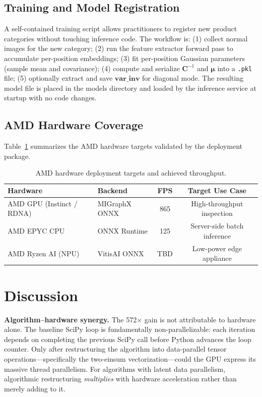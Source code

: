 \documentclass[blind]{gtac}
\begin{document}
\subsection{Training and Model Registration}

A self-contained training script allows practitioners to register new product
categories without touching inference code.  The workflow is:
(1) collect normal images for the new category;
(2) run the feature extractor forward pass to accumulate per-position embeddings;
(3) fit per-position Gaussian parameters (sample mean and covariance);
(4) compute and serialize $\mathbf{C}^{-1}$ and $\boldsymbol{\mu}$ into a
    \texttt{.pkl} file;
(5) optionally extract and save $\mathbf{var\_inv}$ for diagonal mode.
The resulting model file is placed in the models directory and loaded by the
inference service at startup with no code changes.

\subsection{AMD Hardware Coverage}

Table~\ref{tab:hw} summarizes the AMD hardware targets validated by the
deployment package.

\begin{table}[H]
\centering
\caption{AMD hardware deployment targets and achieved throughput.}
\label{tab:hw}
\footnotesize
\begin{tabular}{@{}p{1.1in}p{1.0in}cc@{}}
\toprule
Hardware & Backend & FPS & Target Use Case \\
\midrule
AMD GPU (Instinct / RDNA) & MIGraphX ONNX & 865 & High-throughput inspection \\
AMD EPYC CPU              & ONNX Runtime  & 125 & Server-side batch inference \\
AMD Ryzen AI (NPU)        & VitisAI ONNX  & TBD & Low-power edge appliance \\
\bottomrule
\end{tabular}
\end{table}

\section{Discussion}
\label{sec:discussion}

\textbf{Algorithm--hardware synergy.}
The 572$\times$ gain is not attributable to hardware alone.  The baseline SciPy
loop is fundamentally non-parallelizable: each iteration depends on completing
the previous SciPy call before Python advances the loop counter.  Only after
restructuring the algorithm into data-parallel tensor operations---specifically
the two-einsum vectorization---could the GPU express its massive thread
parallelism.  For algorithms with latent data parallelism, algorithmic
restructuring \emph{multiplies} with hardware acceleration rather than merely
adding to it.
\end{document}

